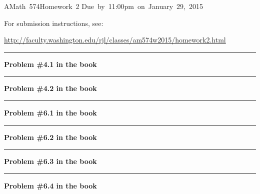 \documentclass[11pt]{article}
\begin{document}
\hfill\vbox{\hbox{AMath 574}\hbox{Homework 2}
\hbox{Due by 11:00pm on January 29, 2015}}

For submission instructions, see:

\url{http://faculty.washington.edu/rjl/classes/am574w2015/homework2.html}

\vskip 1cm
\hrule
{\bf Problem \#4.1 in the book}





\vskip 1cm
\hrule
{\bf Problem \#4.2 in the book}




\vskip 1cm
\hrule
{\bf Problem \#6.1 in the book}




\vskip 1cm
\hrule
{\bf Problem \#6.2 in the book}




\vskip 1cm
\hrule
{\bf Problem \#6.3 in the book}





\vskip 1cm
\hrule
{\bf Problem \#6.4 in the book}


\end{document}
